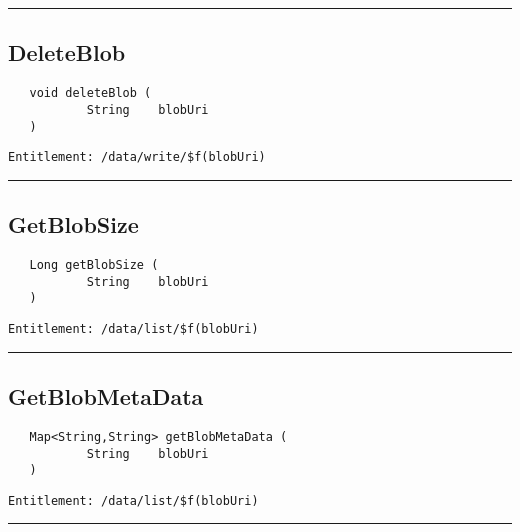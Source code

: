 \rule{12cm}{2pt}
\subsection{DeleteBlob}
\label{Api:DeleteBlob}
\begin{verbatim}
   void deleteBlob (
           String    blobUri
   )
\end{verbatim}
\begin{Verbatim}[fontsize=\small, formatcom=\color{Maroon}]
  Entitlement: /data/write/$f(blobUri)
\end{Verbatim}



\rule{12cm}{2pt}
\subsection{GetBlobSize}
\label{Api:GetBlobSize}
\begin{verbatim}
   Long getBlobSize (
           String    blobUri
   )
\end{verbatim}
\begin{Verbatim}[fontsize=\small, formatcom=\color{Maroon}]
  Entitlement: /data/list/$f(blobUri)
\end{Verbatim}



\rule{12cm}{2pt}
\subsection{GetBlobMetaData}
\label{Api:GetBlobMetaData}
\begin{verbatim}
   Map<String,String> getBlobMetaData (
           String    blobUri
   )
\end{verbatim}
\begin{Verbatim}[fontsize=\small, formatcom=\color{Maroon}]
  Entitlement: /data/list/$f(blobUri)
\end{Verbatim}



\rule{12cm}{2pt}
